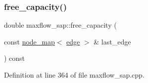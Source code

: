 \mbox{\label{classmaxflow__sap_abd2935db387f32891228291a52d6ad45}} 
\subsubsection{\texorpdfstring{free\+\_\+capacity()}{free\_capacity()}}
{\footnotesize\ttfamily double maxflow\+\_\+sap\+::free\+\_\+capacity (\begin{DoxyParamCaption}\item[{const \mbox{\hyperlink{classnode__map}{node\+\_\+map}}$<$ \mbox{\hyperlink{classedge}{edge}} $>$ \&}]{last\+\_\+edge }\end{DoxyParamCaption}) const\hspace{0.3cm}{\ttfamily [protected]}}



Definition at line 364 of file maxflow\+\_\+sap.\+cpp.


